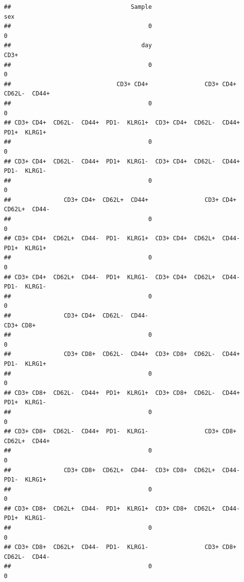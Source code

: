 \documentclass[
]{book}
\begin{document}
\begin{verbatim}
##                                  Sample                                     sex 
##                                       0                                       0 
##                                     day                                   CD3+  
##                                       0                                       0 
##                              CD3+ CD4+                CD3+ CD4+  CD62L-  CD44+  
##                                       0                                       0 
## CD3+ CD4+  CD62L-  CD44+  PD1-  KLRG1+  CD3+ CD4+  CD62L-  CD44+  PD1+  KLRG1+  
##                                       0                                       0 
## CD3+ CD4+  CD62L-  CD44+  PD1+  KLRG1-  CD3+ CD4+  CD62L-  CD44+  PD1-  KLRG1-  
##                                       0                                       0 
##               CD3+ CD4+  CD62L+  CD44+                CD3+ CD4+  CD62L+  CD44-  
##                                       0                                       0 
## CD3+ CD4+  CD62L+  CD44-  PD1-  KLRG1+  CD3+ CD4+  CD62L+  CD44-  PD1+  KLRG1+  
##                                       0                                       0 
## CD3+ CD4+  CD62L+  CD44-  PD1+  KLRG1-  CD3+ CD4+  CD62L+  CD44-  PD1-  KLRG1-  
##                                       0                                       0 
##               CD3+ CD4+  CD62L-  CD44-                               CD3+ CD8+  
##                                       0                                       0 
##               CD3+ CD8+  CD62L-  CD44+  CD3+ CD8+  CD62L-  CD44+  PD1-  KLRG1+  
##                                       0                                       0 
## CD3+ CD8+  CD62L-  CD44+  PD1+  KLRG1+  CD3+ CD8+  CD62L-  CD44+  PD1+  KLRG1-  
##                                       0                                       0 
## CD3+ CD8+  CD62L-  CD44+  PD1-  KLRG1-                CD3+ CD8+  CD62L+  CD44+  
##                                       0                                       0 
##               CD3+ CD8+  CD62L+  CD44-  CD3+ CD8+  CD62L+  CD44-  PD1-  KLRG1+  
##                                       0                                       0 
## CD3+ CD8+  CD62L+  CD44-  PD1+  KLRG1+  CD3+ CD8+  CD62L+  CD44-  PD1+  KLRG1-  
##                                       0                                       0 
## CD3+ CD8+  CD62L+  CD44-  PD1-  KLRG1-                CD3+ CD8+  CD62L-  CD44-  
##                                       0                                       0
\end{verbatim}
\end{document}
